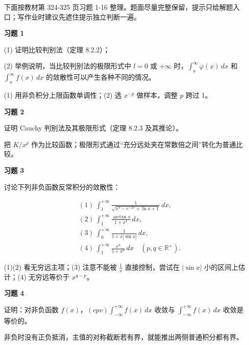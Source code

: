 下面按教材第 324-325 页习题 1-16 整理。题面尽量完整保留，提示只给解题入口；写作业时建议先遮住提示独立判断一遍。

\begin{exercisebox}
\textbf{习题 1 }

(1) 证明比较判别法（定理 8.2.2）；

(2) 举例说明，当比较判别法的极限形式中 \(l=0\) 或 \(+\infty\) 时，\(\int_a^\infty\varphi(x)\,dx\) 和 \(\int_a^\infty f(x)\,dx\) 的敛散性可以产生各种不同的情况。

\begin{hintbox}
(1) 用非负积分上限函数单调性；(2) 选 \(x^{-p}\) 做样本，调整 \(p\) 跨过 1。
\end{hintbox}
\end{exercisebox}

\begin{exercisebox}
\textbf{习题 2 }

证明 Cauchy 判别法及其极限形式（定理 8.2.3 及其推论）。

\begin{hintbox}
把 \(K/x^p\) 作为比较函数；极限形式通过“充分远处夹在常数倍之间”转化为普通比较。
\end{hintbox}
\end{exercisebox}

\begin{exercisebox}
\textbf{习题 3 }

讨论下列非负函数反常积分的敛散性：

\[
      \begin{aligned}
      &(1)\ \int_1^{+\infty}\frac{1}{\sqrt{x^3-e^{-2x}+\ln x+1}}\,dx,\\
      &(2)\ \int_1^{+\infty}\frac{\arctan x}{1+x^3}\,dx,\\
      &(3)\ \int_0^{+\infty}\frac{1}{1+x|\sin x|}\,dx,\\
      &(4)\ \int_1^{+\infty}\frac{x^q}{1+x^p}\,dx\quad(p,q\in\mathbb R^+).
      \end{aligned}
      \]

\begin{hintbox}
(1)(2) 看无穷远主项；(3) 注意不能被 \(\frac1x\) 直接控制，尝试在 \(|\sin x|\) 小的区间上估计；(4) 无穷远等价于 \(x^{q-p}\)。
\end{hintbox}
\end{exercisebox}

\begin{exercisebox}
\textbf{习题 4 }

证明：对非负函数 \(f(x)\)，\((cpv)\int_{-\infty}^{+\infty}f(x)\,dx\) 收敛与 \(\int_{-\infty}^{+\infty}f(x)\,dx\) 收敛是等价的。

\begin{hintbox}
非负时没有正负抵消，主值的对称截断若有界，就能推出两侧普通积分都有界。
\end{hintbox}
\end{exercisebox}

